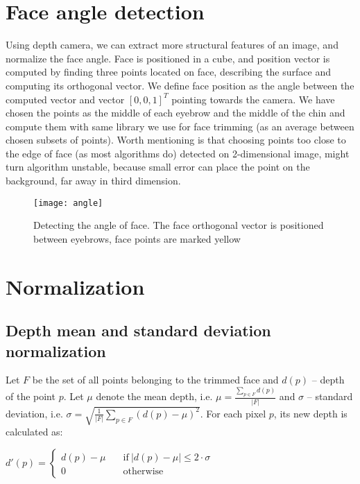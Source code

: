     \section{Face angle detection}
    \label{sec:angledetection}
    Using depth camera, we can extract more structural features of an image,
    and normalize the face angle. Face is positioned in a cube, and position vector is computed
    by finding three points located on face, describing the surface
    and computing its orthogonal vector. We define face position
    as the angle between the computed vector and vector $[0,0,1]^T$ pointing towards the camera.
    We have chosen the points as the middle of each eyebrow and the middle of the chin and compute them with
    same library we use for face trimming (as an average between chosen subsets of points). Worth
    mentioning is that choosing points too close to the edge of face (as most algorithms do)
    detected on 2-dimensional image, might turn algorithm unstable, because small error can place the point on the background,
    far away in third dimension.


    \begin{figure}[H]
    \caption{Detecting the angle of face. The face orthogonal vector is positioned between eyebrows, face points are marked yellow}
    \centering
    \texttt{[image: angle]}
    \end{figure}


    \section{Normalization}
        \subsection*{Depth mean and standard deviation normalization}
        Let $F$ be the set of all points belonging to the trimmed face and
        $d(p)$ -- depth of the point $p$. Let $\mu$ denote the mean depth, i.e.
        $\mu = \frac{\sum\limits_{p \in F}{d(p)}}{|F|}$ and $\sigma$ -- standard
        deviation, i.e. $\sigma = \sqrt{\frac{1}{|F|} \sum\limits_{p \in F}{(d(p) - \mu)^2}}$.
        For each pixel $p$, its new depth is calculated as:

        \begin{center}
        $
          d'(p) = \begin{cases}
                  d(p) - \mu &\quad\text{if}\ |d(p) - \mu| \leqslant 2 \cdot \sigma \\
                  0 &\quad\text{otherwise}
                  \end{cases}
        $
        \end{center}


